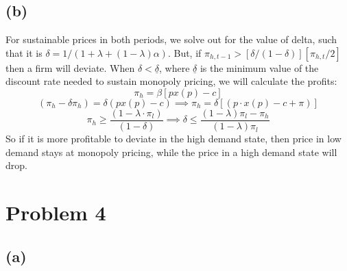 \documentclass{article}
\begin{document}
\subsection*{(b)}

For sustainable prices in both periods, we solve out for the value of delta, such that it is $\delta = 1/(1 + \lambda + (1-\lambda)\alpha)$. But, if $\pi_{h,t-1} > [\delta/(1-\delta)][\pi_{h,t}/2]$ then a firm will deviate. When $\delta < \underline{\delta}$, where $\underline{\delta}$ is the minimum value of the discount rate needed to sustain monopoly pricing, we will calculate the profits: 
\[
\pi_h = \beta[px(p)-c]
\]
\[
(\pi_h - \delta\pi_h) = \delta(px(p)-c) \implies \pi_h = \delta[(p\cdot x(p) - c + \pi)]
\]
\[
\pi_h \geq \frac{(1-\lambda\cdot\pi_l)}{(1-\delta)} \implies \delta \leq \frac{(1-\lambda)\pi_l - \pi_h}{(1-\lambda)\pi_l}
\]
So if it is more profitable to deviate in the high demand state, then price in low demand stays at monopoly pricing, while the price in a high demand state will drop. 

\section{Problem 4}
\subsection*{(a)}
\end{document}
